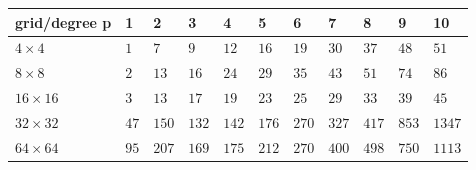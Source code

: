 \begin{tabular}{lllllllllll}
\hline
 grid/degree p   & 1    & 2     & 3     & 4     & 5     & 6     & 7     & 8     & 9     & 10     \\
\hline
 $4 \times 4$    & $1$  & $7$   & $9$   & $12$  & $16$  & $19$  & $30$  & $37$  & $48$  & $51$   \\
 $8 \times 8$    & $2$  & $13$  & $16$  & $24$  & $29$  & $35$  & $43$  & $51$  & $74$  & $86$   \\
 $16 \times 16$  & $3$  & $13$  & $17$  & $19$  & $23$  & $25$  & $29$  & $33$  & $39$  & $45$   \\
 $32 \times 32$  & $47$ & $150$ & $132$ & $142$ & $176$ & $270$ & $327$ & $417$ & $853$ & $1347$ \\
 $64 \times 64$  & $95$ & $207$ & $169$ & $175$ & $212$ & $270$ & $400$ & $498$ & $750$ & $1113$ \\
\hline
\end{tabular}